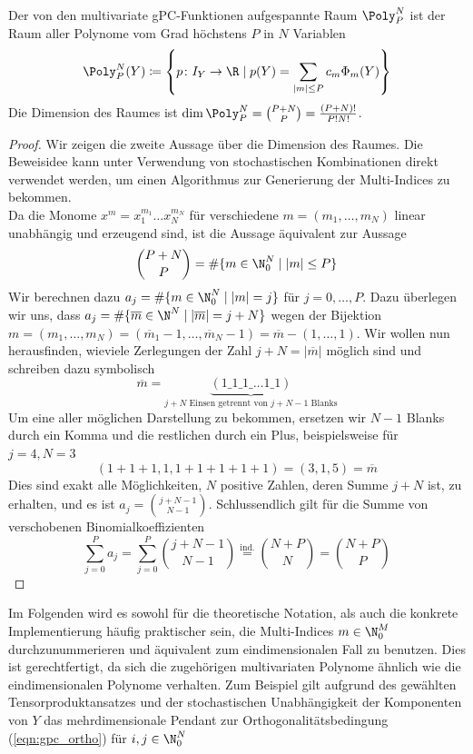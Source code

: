 \begin{mathbem}
Der von den multivariate gPC-Funktionen aufgespannte Raum $\Poly_P^N$ ist der Raum aller Polynome vom Grad höchstens $P$ in $N$ Variablen
\[\Poly_P^N(Y)\coloneqq \left\lbrace p\colon I_Y\to \R \mid p(Y)=\sum_{|m|\le P}c_m\Phi_m(Y)\right\rbrace\]
Die Dimension des Raumes ist $\dim\Poly_P^N=\binom{P+N}{P}=\frac{(P+N)!}{P!N!}$.
\end{mathbem}
\begin{proof}
Wir zeigen die zweite Aussage über die Dimension des Raumes. Die Beweisidee kann unter Verwendung von stochastischen Kombinationen direkt verwendet werden, um einen Algorithmus zur Generierung der Multi-Indices zu bekommen.\\
Da die Monome $x^m=x_1^{m_1}\dots x_N^{m_N}$ für verschiedene $m=(m_1,\dots,m_N)$ linear unabhängig und erzeugend sind, ist die Aussage äquivalent zur Aussage
\[\binom{P+N}{P}=\#\lbrace m\in\N_0^N \mid |m|\le P\rbrace\] 
Wir berechnen dazu $a_j=\#\lbrace m\in\N_0^N \mid |m|=j\rbrace$ für $j=0,\dots,P$. Dazu überlegen wir uns, dass $a_j=\#\lbrace \overline{m}\in\N^N \mid |\overline{m}|=j+N\rbrace$ wegen der Bijektion $m=(m_1,\dots,m_N)=(\overline{m}_1-1,\dots,\overline{m}_N-1)=\overline{m}-(1,\dots,1)$. Wir wollen nun herausfinden, wieviele Zerlegungen der Zahl $j+N=|\overline{m}|$ möglich sind und schreiben dazu symbolisch
\[\overline{m}=\underbrace{(1\_1\_1\_\dots 1\_1)}_{j+N\text{ Einsen getrennt von } j+N-1 \text{ Blanks}}\]
Um eine aller möglichen Darstellung zu bekommen, ersetzen wir $N-1$ Blanks durch ein Komma und die restlichen durch ein Plus, beispielsweise für $j=4,N=3$
\[(1+1+1,1,1+1+1+1+1)=(3,1,5)=\overline{m}\]
Dies sind exakt alle Möglichkeiten, $N$ positive Zahlen, deren Summe $j+N$ ist, zu erhalten, und es ist $a_j=\binom{j+N-1}{N-1}$.
Schlussendlich gilt für die Summe von verschobenen Binomialkoeffizienten 
\[\sum_{j=0}^Pa_j=\sum_{j=0}^P\binom{j+N-1}{N-1}\stackrel{\text{ind.}}{=}\binom{N+P}{N}=\binom{N+P}{P}\]
\end{proof}
Im Folgenden wird es sowohl für die theoretische Notation, als auch die konkrete Implementierung häufig praktischer sein, die Multi-Indices $m\in\N_0^M$ durchzunummerieren und äquivalent zum eindimensionalen Fall zu benutzen. Dies ist gerechtfertigt, da sich die zugehörigen multivariaten Polynome ähnlich wie die eindimensionalen Polynome verhalten. Zum Beispiel gilt aufgrund des gewählten Tensorproduktansatzes und der stochastischen Unabhängigkeit der Komponenten von $Y$ das mehrdimensionale Pendant zur Orthogonalitätsbedingung (\ref{eqn:gpc_ortho}) für $i,j\in\N_0^N$
